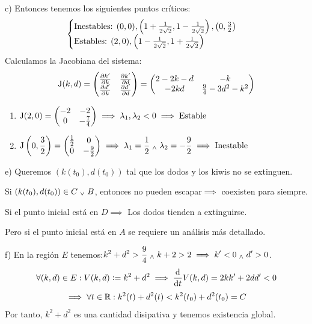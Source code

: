 c) Entonces tenemos los siguientes puntos críticos:
\[\begin{cases}
		\text{Inestables: } (0,0), \left(1+\frac{1}{2\sqrt{2}}, 1-\frac{1}{2\sqrt{2}}\right), \left(0,\frac{3}{2}\right) \\
		\text{Estables: } (2,0), \left(1-\frac{1}{2\sqrt{2}}, 1+\frac{1}{2\sqrt{2}}\right)
	\end{cases}\]
Calculamos la Jacobiana del sistema:
\[\operatorname{J}(k, d) = \begin{pmatrix}
		\pdv{k'}{k} & \pdv{k'}{d} \\
		\pdv{d'}{k} & \pdv{d'}{d}
	\end{pmatrix} = \begin{pmatrix}
		2-2k-d & -k                       \\
		-2kd   & \frac{9}{4} - 3d^2 - k^2
	\end{pmatrix}\]
\begin{enumerate}
	\item $\displaystyle \operatorname{J}(2,0) = \begin{pmatrix}
			      -2 & -2           \\
			      0  & -\frac{7}{4}
		      \end{pmatrix} \implies \lambda_1, \lambda_2 < 0 \implies \text{Estable}$
	\item $\displaystyle \operatorname{J}\left(0, \frac{3}{2}\right) = \begin{pmatrix}
			      \frac{1}{2} & 0            \\
			      0           & -\frac{9}{2}
		      \end{pmatrix} \implies \lambda_1 = \frac{1}{2} \; _{\wedge} \; \lambda_2 = -\frac{9}{2} \implies \text{Inestable}$
\end{enumerate}

e) Queremos $\left(k(t_0), d(t_0)\right)$ tal que los dodos y los kiwis no se extinguen.

Si $\left(k(t_0), d(t_0)\right) \in C \; _{\vee} \; B$, entonces no pueden escapar$\implies$ coexisten para siempre.

Si el punto inicial está en $D \implies$ Los dodos tienden a extinguirse.

Pero si el punto inicial está en $A$ se requiere un análisis más detallado.

f) En la región $E$ tenemos:$\displaystyle k^2 + d^2 > \frac{9}{4} \; _{\wedge} \; k+2 > 2 \implies k' < 0 \; _{\wedge} \; d' > 0$.
\[\forall (k, d) \in E : V(k, d) \defeq k^2 + d^2 \implies \odv{}{t}V(k, d) = 2k k' + 2d d' < 0\]
\[\implies \forall t \in \mathbb{R} : k^2(t) + d^2(t) < k^2(t_0) + d^2(t_0) = C\]
Por tanto, $k^2+d^2$ es una cantidad disipativa y tenemos existencia global.